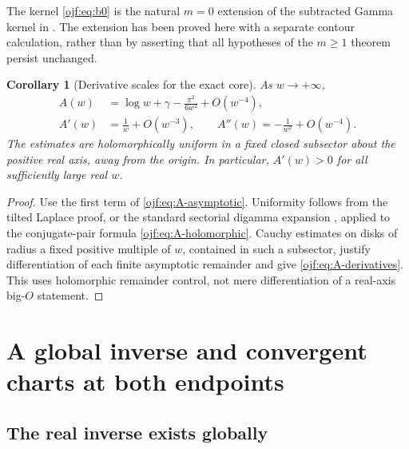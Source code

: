 \documentclass[11pt,a4paper]{article}
\numberwithin{equation}{section}
\newtheorem{corollary}[theorem]{Corollary}
\theoremstyle{definition}\newtheorem{definition}[theorem]{Definition}
\theoremstyle{remark}\newtheorem{remark}[theorem]{Remark}
\begin{document}
The kernel \eqref{ojf:eq:b0} is the natural $m=0$ extension of the
subtracted Gamma kernel in \cite[label
\texttt{thm:Gamma-kernel}]{RepoResonant}. The extension has been proved
here with a separate contour calculation, rather than by asserting
that all hypotheses of the $m\ge1$ theorem persist unchanged.

\begin{corollary}[Derivative scales for the exact core]
\label{ojf:cor:core-derivatives}
As $w\to+\infty$,
\begin{align}
 A(w)&=\log w+\gamma-\frac{\pi^2}{6w^2}+O(w^{-4}),\label{ojf:eq:A-two}\\
 A'(w)&=\frac1w+O(w^{-3}),\qquad
 A''(w)=-\frac1{w^2}+O(w^{-4}).\label{ojf:eq:A-derivatives}
\end{align}
The estimates are holomorphically uniform in a fixed closed subsector
about the positive real axis, away from the origin. In particular,
$A'(w)>0$ for all sufficiently large real $w$.
\end{corollary}
\begin{proof}
Use the first term of \eqref{ojf:eq:A-asymptotic}. Uniformity follows
from the tilted Laplace proof, or the standard sectorial digamma
expansion \cite[Eq.~5.11.2]{DLMFasymptotic}, applied to the conjugate-pair
formula \eqref{ojf:eq:A-holomorphic}. Cauchy estimates on disks of radius
a fixed positive multiple of $w$, contained in such a subsector, justify
differentiation of each finite asymptotic remainder and give
\eqref{ojf:eq:A-derivatives}. This uses holomorphic remainder control,
not mere differentiation of a real-axis big-$O$ statement.
\end{proof}

\section{A global inverse and convergent charts at both endpoints}
\label{ojf:sec:inverse}

\subsection{The real inverse exists globally}
\end{document}

